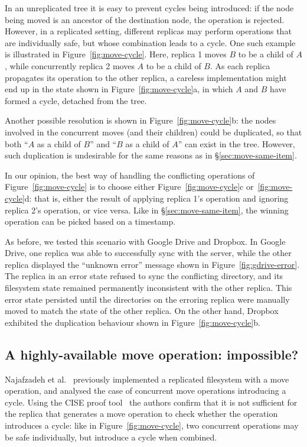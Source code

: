 \documentclass[sigplan,anonymous]{acmart}
\begin{document}
In an unreplicated tree it is easy to prevent cycles being introduced: if the node being moved is an ancestor of the destination node, the operation is rejected.
However, in a replicated setting, different replicas may perform operations that are individually safe, but whose combination leads to a cycle.
One such example is illustrated in Figure~\ref{fig:move-cycle}.
Here, replica 1 moves $B$ to be a child of $A$, while concurrently replica 2 moves $A$ to be a child of $B$.
As each replica propagates its operation to the other replica, a careless implementation might end up in the state shown in Figure~\ref{fig:move-cycle}a, in which $A$ and $B$ have formed a cycle, detached from the tree.

Another possible resolution is shown in Figure~\ref{fig:move-cycle}b: the nodes involved in the concurrent moves (and their children) could be duplicated, so that both ``$A$ as a child of $B$'' and ``$B$ as a child of $A$'' can exist in the tree.
However, such duplication is undesirable for the same reasons as in \S\ref{sec:move-same-item}.

In our opinion, the best way of handling the conflicting operations of Figure~\ref{fig:move-cycle} is to choose either Figure~\ref{fig:move-cycle}c or~\ref{fig:move-cycle}d: that is, either the result of applying replica 1's operation and ignoring replica 2's operation, or vice versa.
Like in \S\ref{sec:move-same-item}, the winning operation can be picked based on a timestamp.

As before, we tested this scenario with Google Drive and Dropbox.
In Google Drive, one replica was able to successfully sync with the server, while the other replica displayed the ``unknown error'' message shown in Figure~\ref{fig:gdrive-error}.
The replica in an error state refused to sync the conflicting directory, and its filesystem state remained permanently inconsistent with the other replica.
This error state persisted until the directories on the erroring replica were manually moved to match the state of the other replica.
On the other hand, Dropbox exhibited the duplication behaviour shown in Figure~\ref{fig:move-cycle}b.

\subsection{A highly-available move operation: impossible?}\label{sec:impossibility}

Najafzadeh et al.~\cite{Najafzadeh:2017vk,Najafzadeh:2018bw} previously implemented a replicated filesystem with a move operation, and analysed the case of concurrent move operations introducing a cycle.
Using the CISE proof tool~\cite{DBLP:conf/popl/GotsmanYFNS16,Najafzadeh:2016fi} the authors confirm that it is not sufficient for the replica that generates a move operation to check whether the operation introduces a cycle: like in Figure~\ref{fig:move-cycle}, two concurrent operations may be safe individually, but introduce a cycle when combined.
\end{document}
